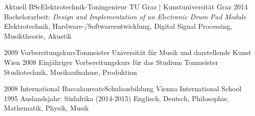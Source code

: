 
\begin{experiences}
	\experience
	{Aktuell}
	{BSc}{Elektrotechnik-Toningenieur}
	{TU Graz | Kunstuniversität Graz}
	{2014}
	{
		Bachelorarbeit:
		\textit{Design and Implementation of an Electronic Drum Pad Module}
	}
	{
		Elektrotechnik,
		Hardware-/Softwareentwicklung,
		Digital Signal Processing,
		Musiktheorie,
		Akustik
	}
	
	\emptySeparator
	
	\experience
	{2009}
	{Vorbereitungskurs}{Tonmeister}
	{Universität für Musik und darstellende Kunst Wien}
	{2008}
	{
		Einjähriger Vorbereitungskurs für das Studium Tonmeister
	}
	{
		Studiotechnik,
		Musikaufnahme,
		Produktion
	}
	
	\emptySeparator
	
	\experience
	{2008}
	{International Baccalaureate}{Schulausbildung}
	{Vienna International School}
	{1995}
	{
		Auslandsjahr: Südafrika (2014-2015)
	}
	{
		Englisch,
		Deutsch,
		Philosophie,
		Mathematik,
		Physik,
		Musik
	}
\end{experiences}